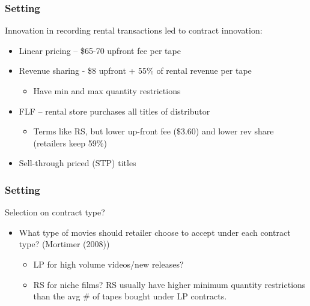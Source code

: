 \documentclass[notes=show]{beamer}
\begin{document}

\begin{frame}
\frametitle{Setting}

Innovation in recording rental transactions led to contract innovation:

\begin{itemize}
\item Linear pricing -- \$65-70 upfront fee per tape

\item Revenue sharing - \$8 upfront + 55\% of rental revenue per tape

\begin{itemize}
\item Have min and max quantity restrictions
\end{itemize}

\item FLF -- rental store purchases all titles of distributor

\begin{itemize}
\item Terms like RS, but lower up-front fee (\$3.60) and lower rev share
(retailers keep 59\%)
\end{itemize}

\item Sell-through priced (STP) titles

\end{itemize}
\end{frame}


\begin{frame}
\frametitle{Setting}

Selection on contract type?

\begin{itemize}
\item What type of movies should retailer choose to accept under each
contract type? (Mortimer (2008))

\begin{itemize}
\item LP for high volume videos/new releases?

\item RS for niche films? RS usually have higher minimum quantity
restrictions than the avg \# of tapes bought under LP contracts.
\end{itemize}

\end{itemize}
\end{frame}
\end{document}
